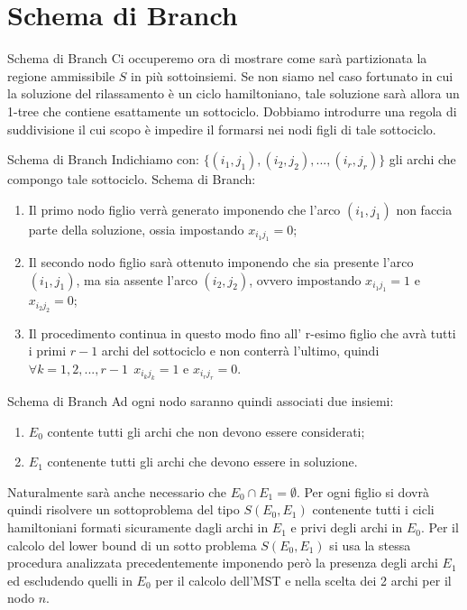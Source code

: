 \documentclass[10pt]{beamer}
\begin{document}
\section{Schema di Branch}
\begin{frame}{Schema di Branch}
    Ci occuperemo ora di mostrare come sarà partizionata la regione ammissibile $S$ in più sottoinsiemi. Se non siamo nel caso fortunato in cui la soluzione del rilassamento è un ciclo hamiltoniano, tale soluzione sarà allora un 1-tree che contiene esattamente un sottociclo. Dobbiamo introdurre una regola di suddivisione il cui scopo è impedire il formarsi nei nodi figli di tale sottociclo.
\end{frame}

\begin{frame}{Schema di Branch}
    Indichiamo con: $\{(i_1, j_1), (i_2,j_2),...,(i_r,j_r)\}$ gli archi che compongo tale sottociclo.
    \newline
    \newline
    Schema di Branch:
    \begin{enumerate}
        \item  Il primo nodo figlio verrà generato imponendo che l'arco $(i_1,j_1)$ non faccia parte della soluzione, ossia impostando $x_{i_{1}j_{1}} = 0$;
        \item Il secondo nodo figlio sarà ottenuto imponendo che sia presente l'arco $(i_1,j_1)$, ma sia assente l'arco $(i_2,j_2)$, ovvero impostando $x_{i_{1}j_{1}} = 1$ e $x_{i_{2}j_{2}} = 0$;
        \item Il procedimento continua in questo modo fino all' r-esimo figlio che avrà tutti i primi $r-1$ archi del sottociclo e non conterrà l'ultimo, quindi $\forall k = 1,2,...,r-1 \:\:x_{i_{k}j_{k}} = 1$ e $x_{i_{r}j_{r}} = 0$.
    \end{enumerate}
     
\end{frame}

\begin{frame}{Schema di Branch}
    Ad ogni nodo saranno quindi associati due insiemi: 
    \begin{enumerate}
        \item $E_0$ contente tutti gli archi che non devono essere considerati;
        \item $E_1$ contenente tutti gli archi che devono essere in soluzione.
    \end{enumerate}
    Naturalmente sarà anche necessario che $E_0 \cap E_1 = \emptyset$.
    \newline
    Per ogni figlio si dovrà quindi risolvere un sottoproblema del tipo $S(E_0, E_1)$ contenente tutti i cicli hamiltoniani formati sicuramente dagli archi in $E_1$ e privi degli archi in $E_0$.
    \newline
    \newline
    Per il calcolo del lower bound di un sotto problema $S(E_0, E_1)$ si usa la stessa procedura analizzata precedentemente imponendo però la presenza degli archi $E_1$ ed escludendo quelli in $E_0$ per il calcolo dell'MST e nella scelta dei 2 archi per il nodo $n$.
\end{frame}
\end{document}
